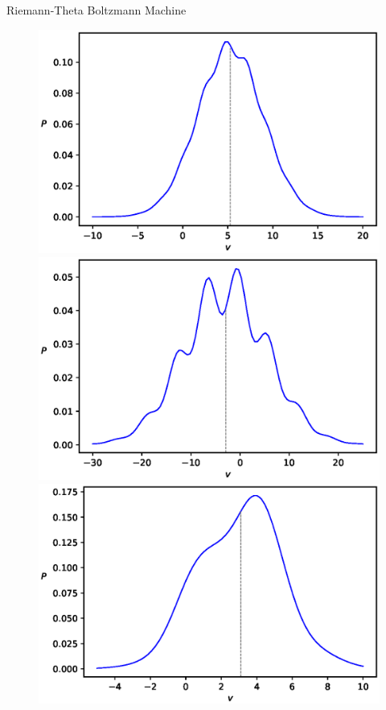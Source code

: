 \documentclass[10pt]{beamer}
\begin{document}
\begin{frame}{Riemann-Theta Boltzmann Machine}
    \begin{figure}
        \begin{center}
          \includegraphics[scale=0.25]{figures/PvPhaseI-1}
          \includegraphics[scale=0.25]{figures/PvPhaseI-2}
          \includegraphics[scale=0.25]{figures/PvPhaseI-3}

\end{center}
\end{figure}
\end{frame}
\end{document}
